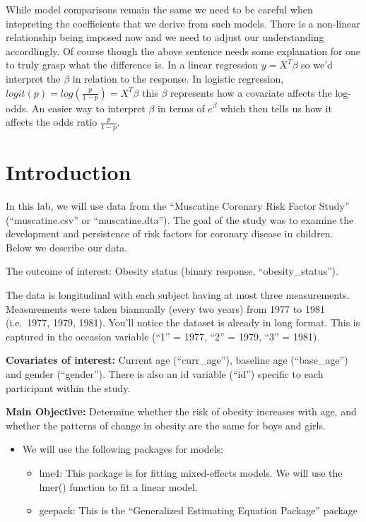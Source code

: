 \documentclass[
  letterpaper,
  DIV=11,
  numbers=noendperiod]{scrreprt}
\providecommand{\tightlist}{%
  \setlength{\itemsep}{0pt}\setlength{\parskip}{0pt}}\usepackage{longtable,booktabs,array}
\begin{document}
While model comparisons remain the same we need to be careful when
intepreting the coefficients that we derive from such models. There is a
non-linear relationship being imposed now and we need to adjust our
understanding accordlingly. Of course though the above sentence needs
some explanation for one to truly grasp what the difference is. In a
linear regression \(y = X^T\beta\) so we'd interpret the \(\beta\) in
relation to the response. In logistic regression,
\(logit(p) = log(\frac{p}{1-p}) = X^T\beta\) this \(\beta\) represents
how a covariate affects the log-odds. An easier way to interpret
\(\beta\) in terms of \(e^\beta\) which then tells us how it affects the
odds ratio \(\frac{p}{1-p}\).

\hypertarget{introduction-2}{%
\section{Introduction}\label{introduction-2}}

In this lab, we will use data from the ``Muscatine Coronary Risk Factor
Study'' (``muscatine.csv'' or ``muscatine.dta''). The goal of the study
was to examine the development and persistence of risk factors for
coronary disease in children. Below we describe our data.

The outcome of interest: Obesity status (binary response,
``obesity\_status'').

The data is longitudinal with each subject having at most three
measurements. Measurements were taken biannually (every two years) from
1977 to 1981 (i.e.~1977, 1979, 1981). You'll notice the dataset is
already in long format. This is captured in the occasion variable (``1''
= 1977, ``2'' = 1979, ``3'' = 1981).

\textbf{Covariates of interest:} Current age (``curr\_age''), baseline
age (``base\_age'') and gender (``gender''). There is also an id
variable (``id'') specific to each participant within the study.

\textbf{Main Objective:} Determine whether the risk of obesity increases
with age, and whether the patterns of change in obesity are the same for
boys and girls.

\begin{itemize}
\tightlist
\item
  We will use the following packages for models:

  \begin{itemize}
  \tightlist
  \item
    lme4: This package is for fitting mixed-effects models. We will use
    the lmer() function to fit a linear model.
  \item
    geepack: This is the ``Generalized Estimating Equation Package''
    package
  \end{itemize}
\end{itemize}
\end{document}
